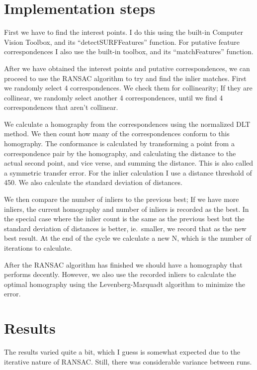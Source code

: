 \section{Implementation steps}

First we have to find the interest points. I do this using the built-in
Computer Vision Toolbox, and its ``detectSURFFeatures'' function.
For putative feature correspondences I also use the built-in toolbox, and its
``matchFeatures'' function.

After we have obtained the interest points and putative correspondences, we can
proceed to use the RANSAC algorithm to try and find the inlier matches. 
First we randomly select 4 correspondences. We check them for collinearity; If
they are collinear, we randomly select another 4 correspondences, until we find
4 correspondences that aren't collinear.

We calculate a homography from the correspondences using the normalized DLT
method. We then count how many of the correspondences conform to this
homography. The conformance is calculated by transforming a point from a
correspondence pair by the homography, and calculating the distance to the
actual second point, and vice verse, and summing the distance. This is also
called a symmetric transfer error. For the inlier calculation I use a distance threshold
of 450. We also calculate the standard deviation of distances.

We then compare the number of inliers to the previous best; If we have more
inliers, the current homography and number of inliers is recorded as the best.
In the special case where the inlier count is the same as the previous best but
the standard deviation of distances is better, ie.\ smaller, we record that as
the new best result. At the end of the cycle we calculate a new N, which is the
number of iterations to calculate.

After the RANSAC algorithm has finished we should have a homography that
performs decently. However, we also use the recorded inliers to calculate the
optimal homography using the Levenberg-Marquadt algorithm to minimize the
error.


\section{Results}

The results varied quite a bit, which I guess is somewhat expected due to the
iterative nature of RANSAC\@. Still, there was considerable variance between
runs.


